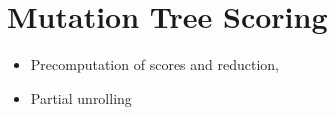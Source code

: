 \section{Mutation Tree Scoring}

\begin{itemize}
    \item Precomputation of scores and reduction,
    \item Partial unrolling
\end{itemize}